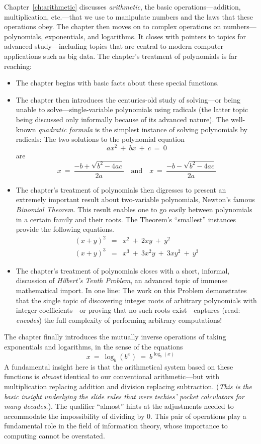 Chapter~\ref{ch:arithmetic} discusses {\it arithmetic}, the basic operations---addition, multiplication, etc.---that we use to manipulate numbers and the laws that these operations obey.  The chapter then moves on to complex operations on numbers---polynomials, exponentials, and logarithms.  It closes with pointers to topics for advanced study---including topics that are central to modern computer applications such as big data.  The chapter's treatment of polynomials is far reaching:
\begin{itemize}
\item
The chapter begins with basic facts about these special functions.
\item
The chapter then introduces the centuries-old study of solving---or being unable to solve---single-variable polynomials using radicals (the latter topic being discussed only informally because of its
advanced nature).  The well-known {\it quadratic formula} is the simplest instance of solving polynomials by radicals: The two solutions to the polynomial equation
\[ ax^2 \ + \ bx \ + \ c \ = \ 0 \]
are
\[ x \ = \ \frac{-b + \sqrt{b^2 - 4ac}}{2a}
 \ \ \ \mbox{ and } \ \ \
   x \ = \ \frac{-b - \sqrt{b^2 - 4ac}}{2a}
\]
\item
The chapter's treatment of polynomials then digresses to present an extremely important result about two-variable polynomials, Newton's famous {\it Binomial Theorem}.  This result enables one to go easily between polynomials in a certain family and their roots.  The Theorem's ``smallest'' instances provide the following equations.
\begin{eqnarray*}
(x + y)^2 & = & x^2 \ + \ 2xy \ + \ y^2 \\
(x + y)^3 & = & x^3 \ + \ 3x^2y \ + \ 3 xy^2 \ + \ y^3
\end{eqnarray*}
\item
The chapter's treatment of polynomials closes with a short, informal, discussion of {\it Hilbert's Tenth Problem}, an advanced topic of immense mathematical import.  In one line: The work on this Problem demonstrates that the single topic of discovering integer roots of arbitrary polynomials with integer coefficients---or proving that no such roots exist---captures (read: {\em encodes}) the full complexity of performing arbitrary computations!
\end{itemize}
The chapter finally introduces the mutually inverse operations of taking exponentials and logarithms, in the sense of the equations
\[  x \ = \ \log_b(b^x) \ = \ b^{\log_b(x)} \]
A fundamental insight here is that the arithmetical system based on these functions is {\em almost} identical to our conventional arithmetic---but with multiplication replacing addition and division replacing subtraction.  ({\em This is the basic insight underlying the {\em slide rules} that were techies' pocket calculators for many decades.}). The qualifier ``almost'' hints at the adjustments needed to accommodate the impossibility of dividing by $0$.  This pair of operations play a fundamental role in the field of information theory, whose importance to computing cannot be overstated.

